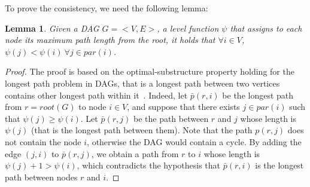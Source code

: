 \documentclass{bioinfo}
\newcommand{\by}{\boldsymbol{y}}
\newtheorem{lemma}{Lemma}
\begin{document}
To prove the consistency, we need the following lemma:
\begin{lemma} 
Given a DAG $G = <V,E>$, a level function $\psi$ that assigns to each node its maximum path length from the root, it holds that $\forall i \in V$, $\psi(j) < \psi(i)\ \forall j \in par(i)$.
\label{th:htd_0}
\end{lemma}
\begin{proof}
The proof is based on the optimal-substructure property holding for the longest path problem in DAGs, that is a longest path between two vertices contains other longest path within it~\cite{Dasgupta08}.
Indeed, let $\bar{p}(r,i)$ be the longest path from $r=root(G)$ to node $i\in V$, and
suppose that there exists $j \in par(i)$ such that $\psi(j) \geq \psi(i)$.
 Let $\bar{p}(r,j)$ be the path between $r$ and $j$ whose length is $\psi(j)$ (that is the longest path between them). Note that the path $p(r,j)$ does not contain the node $i$, otherwise the DAG would contain a cycle. By adding the edge $(j,i)$ to $\bar{p}(r,j)$, we obtain a path from $r$ to $i$ whose length is $\psi(j) + 1 > \psi(i)$, which contradicts the hypothesis that $\bar{p}(r,i)$ is the longest path between nodes $r$ and $i$.
\end{proof}
\end{document}
